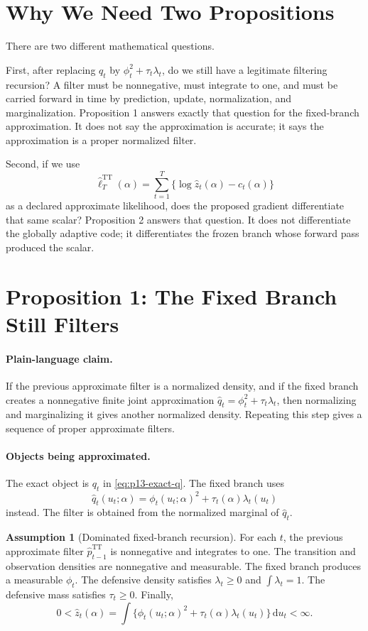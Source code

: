 \documentclass[11pt]{article}
\newcommand{\dd}{\mathrm{d}}
\newcommand{\TT}{\mathrm{TT}}
\theoremstyle{definition}
\newtheorem{assumption}{Assumption}
\theoremstyle{remark}
\begin{document}
\section{Why We Need Two Propositions}

There are two different mathematical questions.

First, after replacing \(q_t\) by \(\phi_t^2+\tau_t\lambda_t\), do we still
have a legitimate filtering recursion?  A filter must be nonnegative, must
integrate to one, and must be carried forward in time by prediction, update,
normalization, and marginalization.  Proposition 1 answers exactly that
question for the fixed-branch approximation.  It does not say the approximation
is accurate; it says the approximation is a proper normalized filter.

Second, if we use
\[
  \widehat\ell_T^{\TT}(\alpha)
  =
  \sum_{t=1}^T\{\log\widehat z_t(\alpha)-c_t(\alpha)\}
\]
as a declared approximate likelihood, does the proposed gradient differentiate
that same scalar?  Proposition 2 answers that question.  It does not
differentiate the globally adaptive code; it differentiates the frozen branch
whose forward pass produced the scalar.

\section{Proposition 1: The Fixed Branch Still Filters}

\paragraph{Plain-language claim.}
If the previous approximate filter is a normalized density, and if the fixed
branch creates a nonnegative finite joint approximation
\(\widehat q_t=\phi_t^2+\tau_t\lambda_t\), then normalizing and marginalizing
it gives another normalized density.  Repeating this step gives a sequence of
proper approximate filters.

\paragraph{Objects being approximated.}
The exact object is \(q_t\) in \eqref{eq:p13-exact-q}.  The fixed branch uses
\[
  \widehat q_t(u_t;\alpha)
  =
  \phi_t(u_t;\alpha)^2+\tau_t(\alpha)\lambda_t(u_t)
\]
instead.  The filter is obtained from the normalized marginal of
\(\widehat q_t\).

\begin{assumption}[Dominated fixed-branch recursion]
For each \(t\), the previous approximate filter
\(\widehat p_{t-1}^{\TT}\) is nonnegative and integrates to one.  The
transition and observation densities are nonnegative and measurable.  The
fixed branch produces a measurable \(\phi_t\).  The defensive density satisfies
\(\lambda_t\ge0\) and \(\int\lambda_t=1\).  The defensive mass satisfies
\(\tau_t\ge0\).  Finally,
\[
  0<\widehat z_t(\alpha)
  =
  \int\{\phi_t(u_t;\alpha)^2+\tau_t(\alpha)\lambda_t(u_t)\}\,\dd u_t
  <\infty.
\]
\end{assumption}
\end{document}

